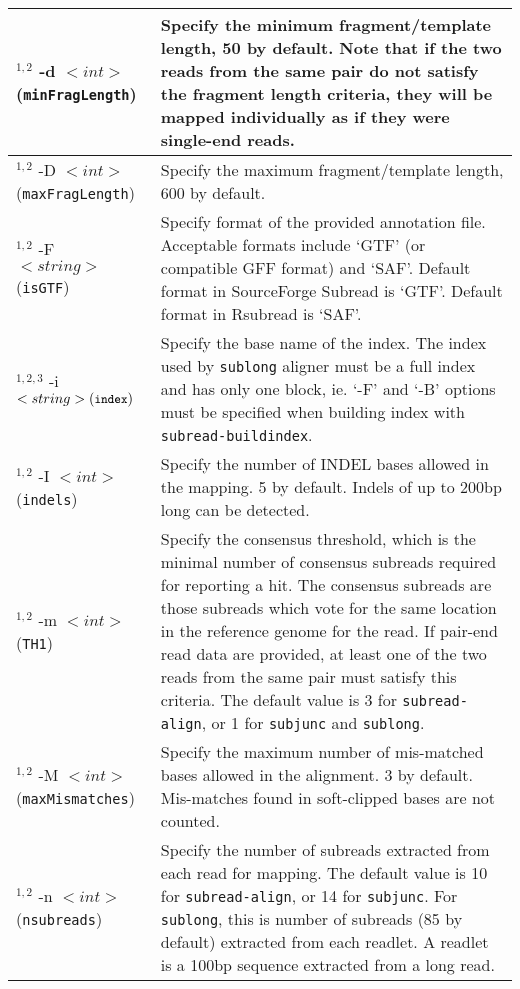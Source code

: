 \documentclass[12pt]{report}
\newcommand{\code}[1]{{\small\texttt{#1}}}
\newcommand{\Subread}{\textsf{Subread}}
\newcommand{\Rsubread}{\textsf{Rsubread}}
\begin{document}
\begin{longtable}{|p{5.5cm}|p{10.5cm}|}
\hline
$^{1,2}$ -d $<int>$ \newline (\code{minFragLength}) & Specify the minimum fragment/template length, 50 by default.  Note that if the two reads from the same pair do not satisfy the fragment length criteria, they will be mapped individually as if they were single-end reads.\\
\hline
$^{1,2}$ -D $<int>$ \newline (\code{maxFragLength}) & Specify the maximum fragment/template length, 600 by default.\\
\hline
$^{1,2}$ -F $<string>$ \newline (\code{isGTF}) & Specify format of the provided annotation file. Acceptable formats include `GTF' (or compatible GFF format) and `SAF'. Default format in SourceForge {\Subread} is `GTF'. Default format in {\Rsubread} is `SAF'.   \\
\hline
$^{1,2,3}$ -i $<string> \newline (\code{index}) $ & Specify the base name of the index. The index used by \code{sublong} aligner must be a full index and has only one block, ie. `-F' and `-B' options must be specified when building index with \code{subread-buildindex}.\\
\hline
$^{1,2}$ -I $<int>$ \newline (\code{indels}) & Specify the number of INDEL bases allowed in the mapping. 5 by default. Indels of up to 200bp long can be detected.\\
\hline
$^{1,2}$ -m  $<int>$ \newline (\code{TH1}) & Specify the consensus threshold, which is the minimal number of consensus subreads required for reporting a hit. The consensus subreads are those subreads which vote for the same location in the reference genome for the read. If pair-end read data are provided, at least one of the two reads from the same pair must satisfy this criteria. The default value is 3 for \code{subread-align}, or 1 for \code{subjunc} and \code{sublong}.\\
\hline
$^{1,2}$ -M $<int>$ \newline (\code{maxMismatches}) & Specify the maximum number of mis-matched bases allowed in the alignment. 3 by default. Mis-matches found in soft-clipped bases are not counted.\\
\hline
$^{1,2}$ -n $<int>$ \newline (\code{nsubreads}) & Specify the number of subreads extracted from each read for mapping. The default value is 10 for \code{subread-align}, or 14 for \code{subjunc}. For \code{sublong}, this is number of subreads (85 by default) extracted from each readlet. A readlet is a 100bp sequence extracted from a long read.\\

\end{longtable}
\end{document}
